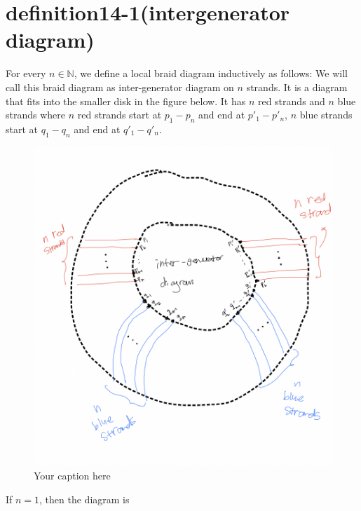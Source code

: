 \section{definition14-1(intergenerator diagram)}
\begin{definition}
\end{definition}

For every $n\in \mathbb{N}$, we define a local braid diagram inductively as follows:
We will call this braid diagram as inter-generator diagram on $n$ strands. It is a diagram that fits into the smaller disk in the figure below. It has $n$ red strands and $n$ blue strands where $n$ red strands start at $p_1 - p_n$ and end at $p'_1 - p'_n$, $n$ blue strands start at $q_1 - q_n$ and end at $q'_1 - q'_n$.

\begin{figure}[H] %
    \centering
    \includegraphics[width=\linewidth]{diagrams/definition14-1/1.png} %
    \caption{Your caption here}
    \label{fig:your-label}
\end{figure}

If $n=1$, then the diagram is 


